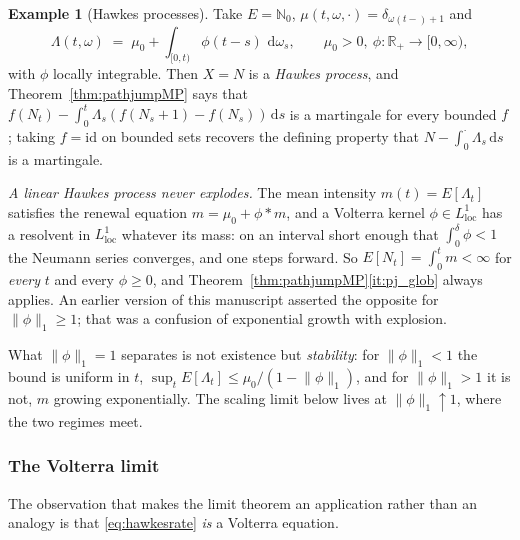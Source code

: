 \documentclass[11pt,a4paper]{article}
\theoremstyle{plain}
\theoremstyle{definition}
\newtheorem{example}[theorem]{Example}
\theoremstyle{remark}
\newcommand{\R}{\mathbb{R}}
\newcommand{\N}{\mathbb{N}}
\newcommand{\Rp}{\R_+}
\newcommand{\dif}{\,\mathrm{d}}
\begin{document}
\begin{example}[Hawkes processes]
  \label{ex:hawkes}
  Take $E = \N_0$, $\mu(t,\omega,\cdot) = \delta_{\omega(t-)+1}$ and
  \begin{equation}
    \label{eq:hawkesrate}
    \Lambda(t,\omega) \;=\; \mu_0 + \int_{[0,t)} \phi(t-s) \, \dif\omega_s ,
    \qquad \mu_0 > 0 , \ \phi : \Rp \to [0,\infty) ,
  \end{equation}
  with $\phi$ locally integrable.  Then $X = N$ is a \emph{Hawkes process}, and
  Theorem~\ref{thm:pathjumpMP} says that
  $f(N_t) - \int_0^t \Lambda_s (f(N_s+1) - f(N_s))\dif s$ is a martingale for every
  bounded $f$; taking $f = \mathrm{id}$ on bounded sets recovers the defining
  property that $N - \int_0^\cdot \Lambda_s \dif s$ is a martingale.

  \emph{A linear Hawkes process never explodes.}  The mean intensity
  $m(t) = E[\Lambda_t]$ satisfies the renewal equation
  $m = \mu_0 + \phi * m$, and a Volterra kernel $\phi \in L^1_{\mathrm{loc}}$ has
  a resolvent in $L^1_{\mathrm{loc}}$ whatever its mass: on an interval short
  enough that $\int_0^\delta \phi < 1$ the Neumann series converges, and one steps
  forward.  So $E[N_t] = \int_0^t m < \infty$ for \emph{every} $t$ and every
  $\phi \geq 0$, and Theorem~\ref{thm:pathjumpMP}\ref{it:pj_glob} always applies.
  An earlier version of this manuscript asserted the opposite for
  $\lVert\phi\rVert_1 \geq 1$; that was a confusion of exponential growth with
  explosion.

  What $\lVert\phi\rVert_1 = 1$ separates is not existence but \emph{stability}:
  for $\lVert\phi\rVert_1 < 1$ the bound is uniform in $t$,
  $\sup_t E[\Lambda_t] \leq \mu_0/(1-\lVert\phi\rVert_1)$, and for
  $\lVert\phi\rVert_1 > 1$ it is not, $m$ growing exponentially.  The scaling
  limit below lives at $\lVert\phi\rVert_1 \uparrow 1$, where the two regimes
  meet.
\end{example}

\subsubsection*{The Volterra limit}

The observation that makes the limit theorem an application rather than an
analogy is that \eqref{eq:hawkesrate} \emph{is} a Volterra equation.
\end{document}
